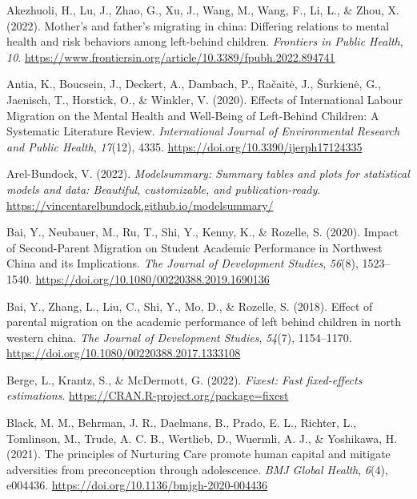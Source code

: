 \documentclass[
  man,floatsintext]{apa7}
\newlength{\cslhangindent}
\newlength{\cslentryspacingunit} %
\newenvironment{CSLReferences}[2] %
 {%
  \setlength{\parindent}{0pt}
  \ifodd #1
  \let\oldpar\par
  \def\par{\hangindent=\cslhangindent\oldpar}
  \fi
  \setlength{\parskip}{#2\cslentryspacingunit}
 }%
 {}
\begin{document}
\hypertarget{refs}{}
\begin{CSLReferences}{1}{0}
\leavevmode{}%
Akezhuoli, H., Lu, J., Zhao, G., Xu, J., Wang, M., Wang, F., Li, L., \& Zhou, X. (2022). Mother's and father's migrating in china: Differing relations to mental health and risk behaviors among left-behind children. \emph{Frontiers in Public Health}, \emph{10}. \url{https://www.frontiersin.org/article/10.3389/fpubh.2022.894741}

\leavevmode{}%
Antia, K., Boucsein, J., Deckert, A., Dambach, P., Račaitė, J., Šurkienė, G., Jaenisch, T., Horstick, O., \& Winkler, V. (2020). Effects of International Labour Migration on the Mental Health and Well-Being of Left-Behind Children: A Systematic Literature Review. \emph{International Journal of Environmental Research and Public Health}, \emph{17}(12), 4335. \url{https://doi.org/10.3390/ijerph17124335}

\leavevmode{}%
Arel-Bundock, V. (2022). \emph{Modelsummary: Summary tables and plots for statistical models and data: Beautiful, customizable, and publication-ready}. \url{https://vincentarelbundock.github.io/modelsummary/}

\leavevmode{}%
Bai, Y., Neubauer, M., Ru, T., Shi, Y., Kenny, K., \& Rozelle, S. (2020). Impact of Second-Parent Migration on Student Academic Performance in Northwest China and its Implications. \emph{The Journal of Development Studies}, \emph{56}(8), 1523--1540. \url{https://doi.org/10.1080/00220388.2019.1690136}

\leavevmode{}%
Bai, Y., Zhang, L., Liu, C., Shi, Y., Mo, D., \& Rozelle, S. (2018). Effect of parental migration on the academic performance of left behind children in north western china. \emph{The Journal of Development Studies}, \emph{54}(7), 1154--1170. \url{https://doi.org/10.1080/00220388.2017.1333108}

\leavevmode{}%
Berge, L., Krantz, S., \& McDermott, G. (2022). \emph{Fixest: Fast fixed-effects estimations}. \url{https://CRAN.R-project.org/package=fixest}

\leavevmode{}%
Black, M. M., Behrman, J. R., Daelmans, B., Prado, E. L., Richter, L., Tomlinson, M., Trude, A. C. B., Wertlieb, D., Wuermli, A. J., \& Yoshikawa, H. (2021). The principles of Nurturing Care promote human capital and mitigate adversities from preconception through adolescence. \emph{BMJ Global Health}, \emph{6}(4), e004436. \url{https://doi.org/10.1136/bmjgh-2020-004436}


\end{CSLReferences}
\end{document}
